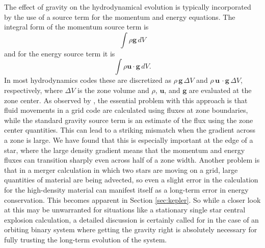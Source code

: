 \documentclass[12pt,preprint]{aastex}
\begin{document}
The effect of gravity on the hydrodynamical evolution is typically incorporated by the use of a source term for the momentum and energy equations. The integral form of the momentum source term is
\begin{equation}
  \int \rho \mathbf{g}\, dV
\end{equation}
and for the energy source term it is
\begin{equation}
  \int \rho \mathbf{u}\cdot\mathbf{g}\, dV \label{eq:cell_center_gravity_source}.
\end{equation}
In most hydrodynamics codes these are discretized as $\rho\, \mathbf{g}\, \Delta V$ and $\rho\, \mathbf{u}\,\cdot\mathbf{g}\, \Delta V$, respectively, where $\Delta V$ is the zone volume and $\rho$, $\mathbf{u}$, and $\mathbf{g}$ are evaluated at the zone center. As observed by \cite{arepo}, the essential problem with this approach is that fluid movements in a grid code are calculated using fluxes at zone boundaries, while the standard gravity source term is an estimate of the flux using the zone center quantities. This can lead to a striking mismatch when the gradient across a zone is large. We have found that this is especially important at the edge of a star, where the large density gradient means that the momentum and energy fluxes can transition sharply even across half of a zone width. Another problem is that in a merger calculation in which two stars are moving on a grid, large quantities of material are being advected, so even a slight error in the calculation for the high-density material can manifest itself as a long-term error in energy conservation. This becomes apparent in Section \ref{sec:kepler}. So while a closer look at this may be unwarranted for situations like a stationary single star central explosion calculation, a detailed discussion is certainly called for in the case of an orbiting binary system where getting the gravity right is absolutely necessary for fully trusting the long-term evolution of the system.
\end{document}
